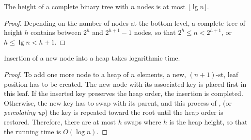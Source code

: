 \begin{Lemma}\label{lem:tree:height}
The height of a complete binary tree with $n$ nodes
is at most $\lfloor \lg n \rfloor$.
\end{Lemma}

\begin{proof} Depending on the number of nodes at the bottom level,
a complete tree of height $h$ contains between $2^{h}$ and
$2^{h+1}-1$ nodes, so that \(2^{h} \le n < 2^{h+1}\),
or \(h \le \lg n < h+1\). \end{proof}


\begin{Lemma} 
Insertion of a new node into a heap takes logarithmic time. 
\end{Lemma}

\begin{proof}
To add one more node to a heap of \(n\) elements, a new,
\((n+1)\)-st, leaf position has to be created. The new node with 
its associated key is placed first in this leaf.  
If the inserted key preserves the heap order, the insertion is
completed. Otherwise, the new key has to swap with
its parent, and this process of , 
(or \emph{percolating up}) the key is repeated toward the root until the heap 
order is restored. Therefore, there are at most $h$ swaps where $h$ is the heap 
height, so that the running time is $O(\log n)$.
\end{proof}

